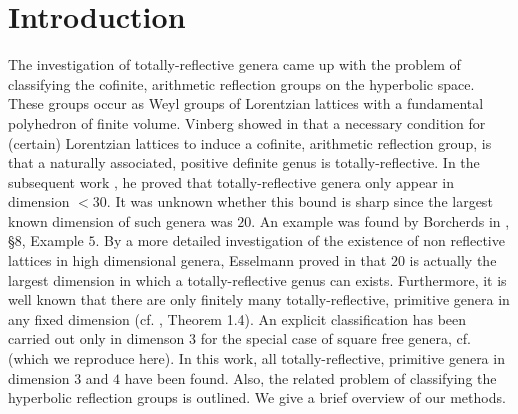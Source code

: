 \documentclass{amsart}
\theoremstyle{definition}
\theoremstyle{remark}
\begin{document}
\section{Introduction}
The investigation of totally-reflective genera came up with the problem of classifying the cofinite, arithmetic reflection groups on the hyperbolic space. 
These groups occur as Weyl groups of Lorentzian lattices with a fundamental polyhedron of finite volume. 
Vinberg showed in \cite{vin72} that a necessary condition for (certain) Lorentzian lattices to induce a cofinite, arithmetic reflection group,
is that a naturally associated, positive definite genus is totally-reflective. In the subsequent work \cite{vin81}, he proved 
that totally-reflective genera only appear in dimension $< 30$. It was unknown whether this bound is sharp since the largest known dimension of such genera was $20$.
An example was found by Borcherds in \cite{bor87}, \S$8$, Example $5$. 
By a more detailed investigation of the existence of non reflective lattices in high dimensional genera, Esselmann proved in \cite{ess96} 
that $20$ is actually the largest dimension in which a totally-reflective genus can exists. Furthermore, it is well known that there are only finitely many totally-reflective, primitive
genera in any fixed
dimension (cf. \cite{sw92}, Theorem 1.4). An explicit classification has been carried out only in dimenson 3 for the special case of square free genera, cf. \cite{wal93} (which we reproduce here). 
In this work, all totally-reflective, primitive genera in dimension $3$ and $4$ have been found. Also, the related problem of classifying the hyperbolic reflection groups is outlined. 
We give a brief overview of our methods.
\end{document}
